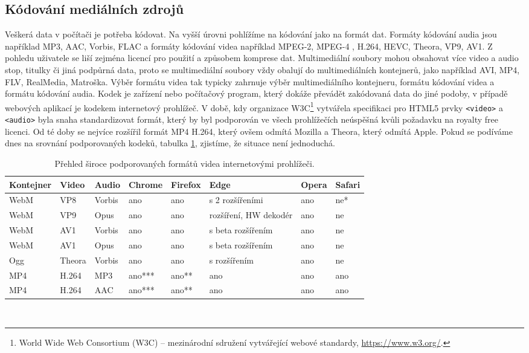 \subsection{Kódování mediálních zdrojů}
Veškerá data v počítači je potřeba kódovat. Na vyšší úrovni pohlížíme na kódování jako na formát dat. Formáty kódování audia  jsou například MP3, AAC, Vorbis, FLAC a formáty kódování videa například MPEG-2, MPEG-4 , H.264, HEVC, Theora, VP9, AV1.  Z pohledu uživatele se liší zejména licencí pro použití a způsobem komprese dat. Multimediální soubory mohou obsahovat více video a audio stop, titulky či jiná podpůrná data, proto se multimediální soubory vždy obalují do multimediálních kontejnerů, jako například AVI, MP4, FLV, RealMedia, Matroška. Výběr formátu videa tak typicky zahrnuje výběr multimediálního kontejneru, formátu kódování videa a formátu kódování audia. Kodek je zařízení nebo počítačový program, který dokáže převádět zakódovaná data do jiné podoby, v případě webových aplikací je kodekem internetový prohlížeč. V době, kdy organizace W3C\footnote{World Wide Web Consortium (W3C) -- mezinárodní sdružení vytvářející webové standardy, \url{https://www.w3.org/}.} vytvářela specifikaci pro HTML5 prvky \texttt{<video>} a \texttt{<audio>} byla snaha standardizovat formát, který by byl podporován ve všech prohlížečích neúspěšná kvůli požadavku na royalty free licenci.\cite{HTML5multimedia} Od té doby se nejvíce rozšířil formát MP4 H.264, který ovšem odmítá Mozilla a Theora, který odmítá Apple. Pokud se podíváme dnes na srovnání podporovaných kodeků, tabulka \ref{tab:codecs}, zjistíme, že situace není jednoduchá.
\begin{table}[h]
    \centering
    \begin{tabular}{|l|l|l||l|l|l|l|l|}
    \hline
    Kontejner   & Video & Audio & Chrome & Firefox & Edge & Opera & Safari \\
    \hline
    WebM        & VP8   & Vorbis &ano & ano & s 2 rozšířeními & ano & ne* \\
    WebM        & VP9   & Opus & ano & ano & rozšíření, HW dekodér & ano & ne \\
    WebM        & AV1   & Vorbis & ano & ano & s beta rozšířením & ano & ne \\
    WebM        & AV1   & Opus & ano & ano & s beta rozšířením & ano & ne \\
    Ogg         & Theora & Vorbis & ano & ano & s rozšířením & ano & ne \\
    MP4         & H.264 & MP3 & ano*** & ano** & ano & ano & ano \\
    MP4         & H.264 & AAC & ano*** & ano** & ano & ano & ano \\
    \hline
    \end{tabular}
    \caption{Přehled široce podporovaných formátů videa internetovými prohlížeči.}
    \label{tab:codecs}
\end{table}\\
